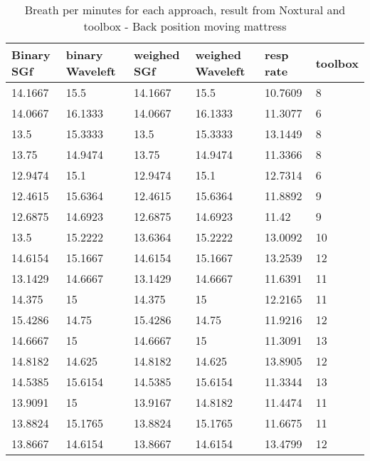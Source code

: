 \begin{table}
\centering
\begin{tabular}{|llllll|}
\hline 
Binary SGf & binary Waveleft & weighed  SGf & weighed Waveleft & resp rate & toolbox \\ 
\hline 
14.1667 & 15.5 & 14.1667 & 15.5 & 10.7609 & 8 \\ 
14.0667 & 16.1333 & 14.0667 & 16.1333 & 11.3077 & 6 \\ 
13.5 & 15.3333 & 13.5 & 15.3333 & 13.1449 & 8 \\ 
13.75 & 14.9474 & 13.75 & 14.9474 & 11.3366 & 8 \\ 
12.9474 & 15.1 & 12.9474 & 15.1 & 12.7314 & 6 \\ 
12.4615 & 15.6364 & 12.4615 & 15.6364 & 11.8892 & 9 \\ 
12.6875 & 14.6923 & 12.6875 & 14.6923 & 11.42 & 9 \\ 
13.5 & 15.2222 & 13.6364 & 15.2222 & 13.0092 & 10 \\ 
14.6154 & 15.1667 & 14.6154 & 15.1667 & 13.2539 & 12 \\ 
13.1429 & 14.6667 & 13.1429 & 14.6667 & 11.6391 & 11 \\ 
14.375 & 15 & 14.375 & 15 & 12.2165 & 11 \\ 
15.4286 & 14.75 & 15.4286 & 14.75 & 11.9216 & 12 \\ 
14.6667 & 15 & 14.6667 & 15 & 11.3091 & 13 \\ 
14.8182 & 14.625 & 14.8182 & 14.625 & 13.8905 & 12 \\ 
14.5385 & 15.6154 & 14.5385 & 15.6154 & 11.3344 & 13 \\ 
13.9091 & 15 & 13.9167 & 14.8182 & 11.4474 & 11 \\ 
13.8824 & 15.1765 & 13.8824 & 15.1765 & 11.6675 & 11 \\ 
13.8667 & 14.6154 & 13.8667 & 14.6154 & 13.4799 & 12 \\ 
\hline 
\end{tabular}


\caption{Breath per minutes for each approach, result from Noxtural and toolbox  - Back position moving mattress}

\end{table}

